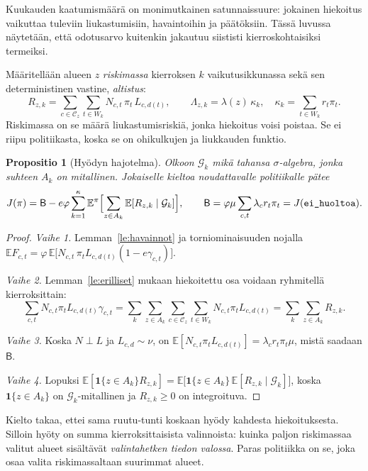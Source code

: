 \documentclass[11pt,a4paper]{article}
\theoremstyle{plain}
\newtheorem{propositio}{Propositio}
\theoremstyle{definition}
\theoremstyle{remark}
\newcommand{\E}{\mathbb{E}}
\newcommand{\cC}{\mathcal{C}}
\newcommand{\cG}{\mathcal{G}}
\newcommand{\1}{\mathbf{1}}
\newcommand{\pol}[1]{\texttt{#1}}
\begin{document}
Kuukauden kaatumismäärä on monimutkainen satunnaissuure: jokainen hiekoitus
vaikuttaa tuleviin liukastumisiin, havaintoihin ja päätöksiin. Tässä luvussa
näytetään, että odotusarvo kuitenkin jakautuu siististi kierroskohtaisiksi
termeiksi.

Määritellään alueen $z$ \emph{riskimassa} kierroksen $k$ vaikutusikkunassa sekä
sen deterministinen vastine, \emph{altistus}:
\[
  R_{z,k} = \sum_{c \in \cC_z} \sum_{t \in W_k} N_{c,t}\, \pi_t\, L_{c,d(t)},
  \qquad
  \Lambda_{z,k} = \lambda(z)\, \kappa_k, \quad \kappa_k = \sum_{t \in W_k} r_t \pi_t .
\]
Riskimassa on se määrä liukastumisriskiä, jonka hiekoitus voisi poistaa.
Se ei riipu politiikasta, koska se on ohikulkujen ja liukkauden funktio.

\begin{propositio}[Hyödyn hajotelma]\label{pr:hajotelma}
Olkoon $\cG_k$ mikä tahansa $\sigma$-algebra, jonka suhteen $A_k$ on mitallinen.
Jokaiselle kieltoa noudattavalle politiikalle pätee
\[
  J(\pi) = \mathsf{B} - e \varphi \sum_{k=1}^{\kappa}
  \E^\pi\Bigl[\sum_{z \in A_k} \E[R_{z,k} \mid \cG_k]\Bigr],
  \qquad
  \mathsf{B} = \varphi \mu \sum_{c,t} \lambda_c r_t \pi_t = J(\pol{ei\_huoltoa}).
\]
\end{propositio}

\begin{proof}
\emph{Vaihe 1.} Lemman~\ref{le:havainnot} ja torniominaisuuden nojalla
$\E F_{c,t} = \varphi\,\E\bigl[N_{c,t}\, \pi_t L_{c,d(t)} (1 - e\gamma_{c,t})\bigr]$.

\emph{Vaihe 2.} Lemman~\ref{le:erilliset} mukaan hiekoitettu osa voidaan
ryhmitellä kierroksittain:
\[
  \sum_{c,t} N_{c,t}\pi_t L_{c,d(t)} \gamma_{c,t}
  = \sum_k \sum_{z \in A_k} \sum_{c \in \cC_z} \sum_{t \in W_k} N_{c,t}\pi_t L_{c,d(t)}
  = \sum_k \sum_{z \in A_k} R_{z,k}.
\]

\emph{Vaihe 3.} Koska $N \perp L$ ja $L_{c,d} \sim \nu$, on
$\E[N_{c,t}\pi_t L_{c,d(t)}] = \lambda_c r_t \pi_t \mu$, mistä saadaan $\mathsf{B}$.

\emph{Vaihe 4.} Lopuksi
$\E[\1\{z \in A_k\} R_{z,k}] = \E\bigl[\1\{z \in A_k\}\,\E[R_{z,k} \mid \cG_k]\bigr]$,
koska $\1\{z \in A_k\}$ on $\cG_k$-mitallinen ja $R_{z,k} \ge 0$ on integroituva.
\end{proof}

\begin{intuitio}
Kielto takaa, ettei sama ruutu-tunti koskaan hyödy kahdesta hiekoituksesta.
Silloin hyöty on summa kierroksittaisista valinnoista: kuinka paljon
riskimassaa valitut alueet sisältävät \emph{valintahetken tiedon valossa}.
Paras politiikka on se, joka osaa valita riskimassaltaan suurimmat alueet.
\end{intuitio}
\end{document}
